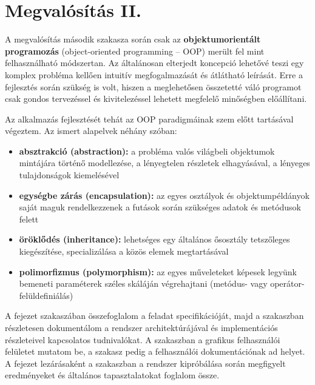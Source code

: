 \chapter{Megvalósítás II.}\label{sect:megvalositas_2}

A megvalósítás második szakasza során csak az \textbf{objektumorientált programozás} (object-oriented programming -- OOP) merült fel mint felhasználható módszertan. Az általánosan elterjedt koncepció lehetővé teszi egy komplex probléma kellően intuitív megfogalmazását és átlátható leírását. Erre a fejlesztés során szükség is volt, hiszen a meglehetősen összetetté váló programot csak gondos tervezéssel és kivitelezéssel lehetett megfelelő minőségben előállítani.

Az alkalmazás fejlesztését tehát az OOP paradigmáinak szem előtt tartásával végeztem. Az ismert alapelvek néhány szóban:

\begin{itemize}
  \item \textbf{absztrakció (abstraction):} a probléma valós világbeli objektumok mintájára történő modellezése, a lényegtelen részletek elhagyásával, a lényeges tulajdonságok kiemelésével
  \item \textbf{egységbe zárás (encapsulation):} az egyes osztályok és objektumpéldányok saját maguk rendelkezzenek a futások során szükséges adatok és metódusok felett
  \item \textbf{öröklődés (inheritance):} lehetséges egy általános ősosztály tetszőleges kiegészítése, specializálása a közös elemek megtartásával
  \item \textbf{polimorfizmus (polymorphism):} az egyes műveleteket képesek legyünk bemeneti paraméterek széles skáláján végrehajtani (metódus- vagy operátor-felüldefiniálás)
\end{itemize}

A fejezet  szakaszában összefoglalom a feladat specifikációját, majd a  szakaszban részletesen dokumentálom a rendszer architektúrájával és implementációs részleteivel kapcsolatos tudnivalókat. A  szakaszban a grafikus felhasználói felületet mutatom be, a  szakasz pedig a felhasználói dokumentációnak ad helyet. A fejezet lezárásaként a  szakaszban a rendszer kipróbálása során megfigyelt eredményeket és általános tapasztalatokat foglalom össze.

